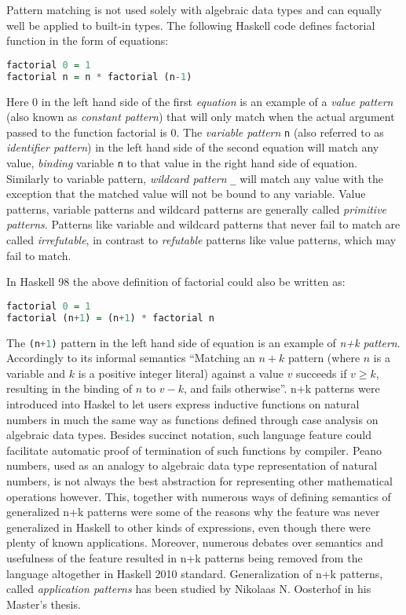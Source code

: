 \documentclass[preprint]{sigplanconf}
\DeclareRobustCommand{\codehaskell}[1]{{\lstinline[breaklines=false,language=Haskell]{#1}}}
\begin{document}
Pattern matching is not used solely with algebraic data types and can equally 
well be applied to built-in types. The following Haskell code defines factorial 
function in the form of equations:

\begin{lstlisting}[language=Haskell]
factorial 0 = 1
factorial n = n * factorial (n-1)
\end{lstlisting}

Here 0 in the left hand side of the first \emph{equation} is an example of a 
\emph{value pattern} (also known as \emph{constant pattern}) that will only 
match when the actual argument passed to the function factorial is 0. The 
\emph{variable pattern} \codehaskell{n} (also referred to as \emph{identifier 
pattern}) in the left hand side of the second equation will match any value, 
\emph{binding} variable \codehaskell{n} to that value in the right hand side of 
equation. Similarly to variable  
pattern, \emph{wildcard pattern} \codehaskell{_} will match any value with the 
exception that the matched value will not be bound to any variable. Value 
patterns, variable patterns and wildcard patterns are generally called 
\emph{primitive patterns}. Patterns like variable and wildcard patterns that 
never fail to match are called \emph{irrefutable}, in contrast to 
\emph{refutable} patterns like value patterns, which may fail to match.

In Haskell 98\cite{Haskell98Book} the above definition of factorial could also 
be written as:

\begin{lstlisting}[language=Haskell]
factorial 0 = 1
factorial (n+1) = (n+1) * factorial n
\end{lstlisting}

The \codehaskell{(n+1)} pattern in the left hand side of equation is an example of 
\emph{n+k pattern}. Accordingly to its informal semantics ``Matching an $n+k$ 
pattern (where $n$ is a variable and $k$ is a positive integer literal) against 
a value $v$ succeeds if $v \ge k$, resulting in the binding of $n$ to $v-k$, and 
fails otherwise''\cite{haskell98}. n+k patterns were introduced into Haskel to 
let users express inductive functions on natural numbers in much the same way as 
functions defined through case analysis on algebraic data types. Besides 
succinct notation, such language feature could facilitate automatic proof of 
termination of such functions by compiler. Peano numbers, used as an analogy to 
algebraic data type representation of natural numbers, is not always the best 
abstraction for representing other mathematical operations however. This,  
together with numerous ways of defining semantics of generalized n+k patterns 
were some of the reasons why the feature was never generalized in Haskell to 
other kinds of expressions, even though there were plenty of known applications. 
Moreover, numerous debates over semantics and usefulness of the feature 
resulted in n+k patterns being removed from the language altogether in Haskell 
2010 standard\cite{haskell2010}. Generalization of n+k patterns, called 
\emph{application patterns} has been studied by Nikolaas N. Oosterhof in his 
Master's thesis\cite{OosterhofThesis}.
\end{document}
